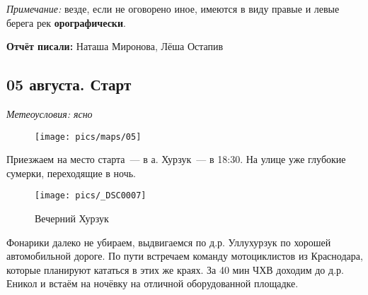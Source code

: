 \textit{Примечание:} везде, если не оговорено иное, имеются в виду правые и левые берега рек \textbf{орографически}.

\textbf{Отчёт писали:} Наташа Миронова, Лёша Остапив
\subsection{05 августа. Старт}
\textit{Метеоусловия: ясно}

\begin{figure}[h!]
	\centering
	\texttt{[image: pics/maps/05]}
	\label{fig:05}
\end{figure}

Приезжаем на место старта~--- в а. Хурзук~--- в 18:30. На улице уже глубокие сумерки, переходящие в ночь.

\begin{figure}[h!]
	\centering
	\texttt{[image: pics/\_DSC0007]}
	\caption{Вечерний Хурзук}
	\label{fig:_DSC0007}
\end{figure}

Фонарики далеко не убираем, выдвигаемся по д.р. Уллухурзук по хорошей автомобильной дороге. По пути встречаем команду мотоциклистов из Краснодара, которые планируют кататься в этих же краях. За 40 мин ЧХВ доходим до д.р. Еникол и встаём на ночёвку на отличной оборудованной площадке.

\clearpage